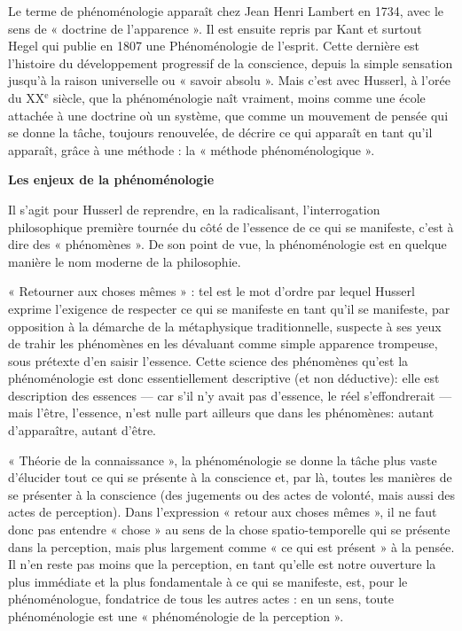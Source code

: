 Le terme de phénoménologie apparaît
chez Jean Henri Lambert en 1734, avec
le sens de « doctrine de l'apparence ». Il
est ensuite repris par Kant et surtout
Hegel qui publie en 1807 une Phénoménologie
de l'esprit. Cette dernière est
l’histoire du développement progressif
de la conscience, depuis la simple sensation
jusqu’à la raison universelle ou
« savoir absolu ». Mais c'est avec Husserl,
à l’orée du {\footnotesize XX}$^\text{e}$ siècle, que la phénoménologie
naît vraiment, moins
comme une école attachée à une doctrine
où un système, que comme un
mouvement de pensée qui se donne la
tâche, toujours renouvelée, de décrire ce
qui apparaît en tant qu'il apparaît, grâce
à une méthode : la « méthode phénoménologique ».

\vspace{0.5cm}
{\bf Les enjeux de la phénoménologie}

Il s’agit pour Husserl de reprendre, en la
radicalisant, l'interrogation philosophique
première tournée du côté de l’essence de
ce qui se manifeste, c’est à dire des « phénomènes ».
De son point de vue, la phénoménologie
est en quelque manière le
nom moderne de la philosophie.

« Retourner aux choses mêmes » : tel est
le mot d'ordre par lequel Husserl
exprime l'exigence de respecter ce qui
se manifeste en tant qu'il se manifeste,
par opposition à la démarche de la
métaphysique traditionnelle, suspecte à
ses yeux de trahir les phénomènes en
les dévaluant comme simple apparence
trompeuse, sous prétexte d'en saisir
l'essence. Cette science des phénomènes
qu'est la phénoménologie est
donc essentiellement descriptive (et non
déductive): elle est description des
essences — car s'il n'y avait pas d’essence,
le réel s’effondrerait — mais
l'être, l'essence, n’est nulle part ailleurs
que dans les phénomènes: autant
d’apparaître, autant d'être.

« Théorie de la connaissance », la phénoménologie
se donne la tâche plus vaste
d'élucider tout ce qui se présente à la
conscience et, par là, toutes les manières
de se présenter à la conscience (des jugements
ou des actes de volonté, mais aussi
des actes de perception). Dans l’expression
« retour aux choses mêmes », il ne
faut donc pas entendre « chose » au sens
de la chose spatio-temporelle qui se présente
dans la perception, mais plus largement
comme « ce qui est présent » à la
pensée. Il n’en reste pas moins que la
perception, en tant qu'elle est notre
ouverture la plus immédiate et la plus
fondamentale à ce qui se manifeste, est,
pour le phénoménologue, fondatrice de
tous les autres actes : en un sens, toute
phénoménologie est une « phénoménologie
de la perception ».


